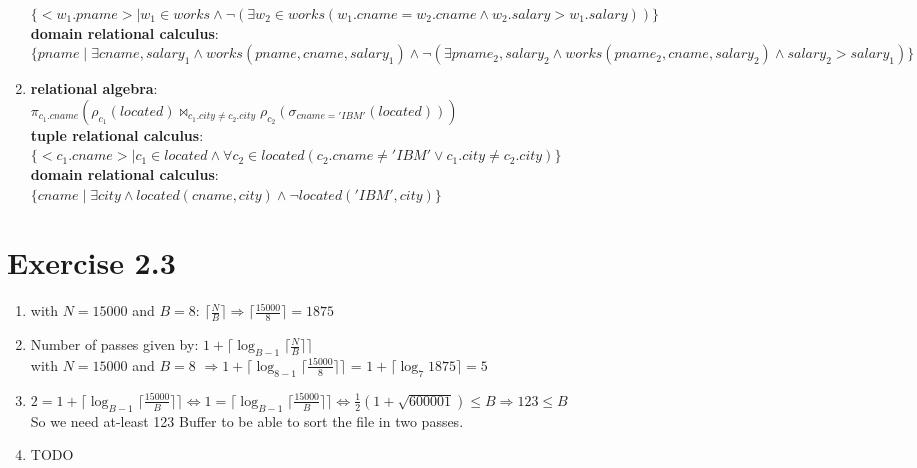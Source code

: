 \documentclass[12pt]{article}
\begin{document}
\begin{enumerate}[label = 2.2.\arabic*]
			$\{ <w_1.pname> \mid w_1 \in works \land \lnot(\exists w_2 \in works(w_1.cname = w_2.cname \land w_2.salary > w_1.salary ))\} $ \\
			\textbf{domain relational calculus}:\\
			$\{ pname \mid \exists cname, salary_1 \land works(pname,cname,salary_1) \land \lnot(\exists pname_2, salary_2 \land works(pname_2,cname,salary_2) \land salary_2 > salary_1  )\} $ \\
		\item 
			\textbf{relational algebra}:\\
			$\pi_{c_1.cname}( \rho_{c_1}(located) \bowtie_{c_1.city \neq c_2.city} \rho_{c_2}(\sigma_{cname='IBM'}(located)) ) $ \\
			\textbf{tuple relational calculus}:\\
			$\{ <c_1.cname> \mid c_1\in located \land \forall c_2\in located (c_2.cname \neq 'IBM' \lor c_1.city \neq c_2.city) \} $ \\
			\textbf{domain relational calculus}:\\
			$\{ cname \mid \exists city \land located(cname, city) \land \lnot located('IBM', city)\}$ \\
	\end{enumerate}

	\section{Exercise 2.3}
	\begin{enumerate}[label=2.3.\arabic*]
		\item with $N=15000$ and $B=8$: $\lceil \frac{N}{B} \rceil \Rightarrow \lceil \frac{15000}{8} \rceil = 1875$
		\item Number of passes given by: $1+\lceil \log_{B-1}\lceil \frac{N}{B} \rceil \rceil$\\
			  with $N=15000$ and $B=8$ $\Rightarrow 1+\lceil \log_{8-1}\lceil \frac{15000}{8} \rceil \rceil$ = $1+\lceil \log_7 1875 \rceil = 5 $
		\item $ 2 = 1+\lceil \log_{B-1}\lceil \frac{15000}{B} \rceil \rceil \Leftrightarrow 1 = \lceil \log_{B-1}\lceil \frac{15000}{B} \rceil \rceil \Leftrightarrow \frac{1}{2}(1+\sqrt{600001}) \le B \Rightarrow 123 \le B$ \\
		So we need at-least 123 Buffer to be able to sort the file in two passes. %
		\item TODO %
		
	\end{enumerate}
\end{document}
